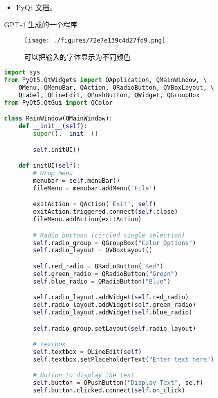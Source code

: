 
\begin{issues}
\issueDraft
\end{issues}

\begin{itemize}
\item PyQt \href{https://www.riverbankcomputing.com/static/Docs/PyQt5/}{文档}。
\end{itemize}


GPT-4 生成的一个程序
\begin{figure}[ht]
\centering
\texttt{[image: ./figures/72e7e139c4d27fd9.png]}
\caption{可以把输入的字体显示为不同颜色} \label{fig_PyQt_1}
\end{figure}


\begin{lstlisting}[language=python]
import sys
from PyQt5.QtWidgets import QApplication, QMainWindow, \ 
    QMenu, QMenuBar, QAction, QRadioButton, QVBoxLayout, \ 
    QLabel, QLineEdit, QPushButton, QWidget, QGroupBox
from PyQt5.QtGui import QColor

class MainWindow(QMainWindow):
    def __init__(self):
        super().__init__()

        self.initUI()

    def initUI(self):
        # Drop menu
        menubar = self.menuBar()
        fileMenu = menubar.addMenu('File')

        exitAction = QAction('Exit', self)
        exitAction.triggered.connect(self.close)
        fileMenu.addAction(exitAction)

        # Radio buttons (circled single selection)
        self.radio_group = QGroupBox("Color Options")
        self.radio_layout = QVBoxLayout()

        self.red_radio = QRadioButton("Red")
        self.green_radio = QRadioButton("Green")
        self.blue_radio = QRadioButton("Blue")

        self.radio_layout.addWidget(self.red_radio)
        self.radio_layout.addWidget(self.green_radio)
        self.radio_layout.addWidget(self.blue_radio)

        self.radio_group.setLayout(self.radio_layout)

        # Textbox
        self.textbox = QLineEdit(self)
        self.textbox.setPlaceholderText("Enter text here")

        # Button to display the text
        self.button = QPushButton("Display Text", self)
        self.button.clicked.connect(self.on_click)


\end{lstlisting}

